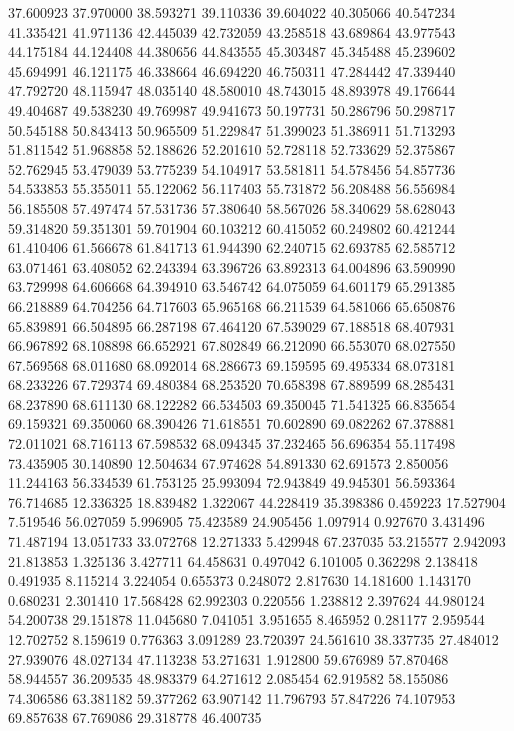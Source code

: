 37.600923
37.970000
38.593271
39.110336
39.604022
40.305066
40.547234
41.335421
41.971136
42.445039
42.732059
43.258518
43.689864
43.977543
44.175184
44.124408
44.380656
44.843555
45.303487
45.345488
45.239602
45.694991
46.121175
46.338664
46.694220
46.750311
47.284442
47.339440
47.792720
48.115947
48.035140
48.580010
48.743015
48.893978
49.176644
49.404687
49.538230
49.769987
49.941673
50.197731
50.286796
50.298717
50.545188
50.843413
50.965509
51.229847
51.399023
51.386911
51.713293
51.811542
51.968858
52.188626
52.201610
52.728118
52.733629
52.375867
52.762945
53.479039
53.775239
54.104917
53.581811
54.578456
54.857736
54.533853
55.355011
55.122062
56.117403
55.731872
56.208488
56.556984
56.185508
57.497474
57.531736
57.380640
58.567026
58.340629
58.628043
59.314820
59.351301
59.701904
60.103212
60.415052
60.249802
60.421244
61.410406
61.566678
61.841713
61.944390
62.240715
62.693785
62.585712
63.071461
63.408052
62.243394
63.396726
63.892313
64.004896
63.590990
63.729998
64.606668
64.394910
63.546742
64.075059
64.601179
65.291385
66.218889
64.704256
64.717603
65.965168
66.211539
64.581066
65.650876
65.839891
66.504895
66.287198
67.464120
67.539029
67.188518
68.407931
66.967892
68.108898
66.652921
67.802849
66.212090
66.553070
68.027550
67.569568
68.011680
68.092014
68.286673
69.159595
69.495334
68.073181
68.233226
67.729374
69.480384
68.253520
70.658398
67.889599
68.285431
68.237890
68.611130
68.122282
66.534503
69.350045
71.541325
66.835654
69.159321
69.350060
68.390426
71.618551
70.602890
69.082262
67.378881
72.011021
68.716113
67.598532
68.094345
37.232465
56.696354
55.117498
73.435905
30.140890
12.504634
67.974628
54.891330
62.691573
2.850056
11.244163
56.334539
61.753125
25.993094
72.943849
49.945301
56.593364
76.714685
12.336325
18.839482
1.322067
44.228419
35.398386
0.459223
17.527904
7.519546
56.027059
5.996905
75.423589
24.905456
1.097914
0.927670
3.431496
71.487194
13.051733
33.072768
12.271333
5.429948
67.237035
53.215577
2.942093
21.813853
1.325136
3.427711
64.458631
0.497042
6.101005
0.362298
2.138418
0.491935
8.115214
3.224054
0.655373
0.248072
2.817630
14.181600
1.143170
0.680231
2.301410
17.568428
62.992303
0.220556
1.238812
2.397624
44.980124
54.200738
29.151878
11.045680
7.041051
3.951655
8.465952
0.281177
2.959544
12.702752
8.159619
0.776363
3.091289
23.720397
24.561610
38.337735
27.484012
27.939076
48.027134
47.113238
53.271631
1.912800
59.676989
57.870468
58.944557
36.209535
48.983379
64.271612
2.085454
62.919582
58.155086
74.306586
63.381182
59.377262
63.907142
11.796793
57.847226
74.107953
69.857638
67.769086
29.318778
46.400735
